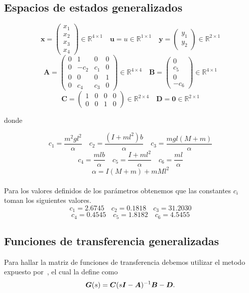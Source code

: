 \subsection{Espacios de estados generalizados}
\[
  \bm{x} =
  \begin{pmatrix}
    x_1\\
    x_2\\
    x_3\\
    x_4
  \end{pmatrix}
  \in \mathbb{R}^{4 \times 1} \quad
  \bm{u} = u \in \mathbb{R}^{1 \times 1} \quad
  \bm{y} =
  \begin{pmatrix}
    y_1\\
    y_2
  \end{pmatrix}
  \in \mathbb{R}^{2 \times 1}
\]
\[
  \bm{A} =
  \begin{pmatrix}
    0 & 1    & 0   & 0 \\
    0 & -c_2 & c_1  & 0 \\
    0 & 0    & 0   & 1 \\
    0 & c_4  & c_3  & 0
  \end{pmatrix}
  \in \mathbb{R}^{4 \times 4}
  \quad
  \bm{B} =
  \begin{pmatrix}
    0   \\
    c_5 \\
    0   \\
    -c_6
  \end{pmatrix}
  \in \mathbb{R}^{4 \times 1}
\]
\[
  \bm{C} =
  \begin{pmatrix}
    1 & 0 & 0 & 0 \\
    0 & 0 & 1 & 0
  \end{pmatrix}
  \in \mathbb{R}^{2 \times 4} \quad
  \bm{D} = \bm{0} \in \mathbb{R}^{2 \times 1}
\]

donde

\[ c_1 = \frac{m^2 g l^2}{\alpha} \quad c_2 = \frac{(I + m l^2) b}{\alpha} \quad
   c_3 = \frac{m g l (M + m)}{\alpha} \]
\[ c_4 = \frac{m l b}{\alpha} \quad c_5 = \frac{I + m l^2}{\alpha} \quad
   c_6 = \frac{m l}{\alpha} \]
\[\alpha = I(M + m) + m M l^2\]
\\
Para los valores definidos de los parámetros obtenemos que las constantes $c_i$
toman los siguientes valores.
\[ c_1 = 2.6745 \quad c_2 = 0.1818 \quad c_3 = 31.2030 \]
\[ c_4 = 0.4545 \quad c_5 = 1.8182 \quad c_6 = 4.5455 \]


\subsection{Funciones de transferencia generalizadas}
Para hallar la matriz de funciones de transferencia debemos utilizar el metodo
expuesto por~\cite{dorf67}, el cual la define como
\[ \vb*{G}(s) = \vb*{C} (s \vb*{I} - \vb*{A})^{-1} \vb*{B} - \vb*{D}. \]
\\

